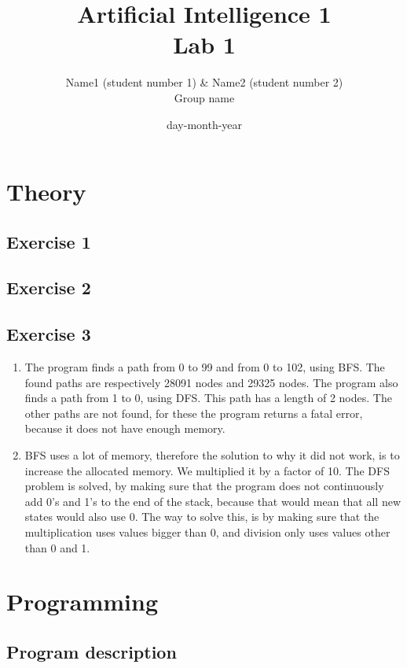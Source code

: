 \documentclass{article}
\title{Artificial Intelligence 1 \\ Lab 1}%
\author{Name1 (student number 1) \& Name2 (student number 2) \\ Group name} %
\date{day-month-year}%
\begin{document}
\maketitle

\section*{Theory}
\subsection*{Exercise 1}

\subsection*{Exercise 2}

\subsection*{Exercise 3}
\begin{enumerate}
\item The program finds a path from 0 to 99 and from 0 to 102, using BFS. The found paths are respectively 28091 nodes and 29325 nodes. The program also finds a path from 1 to 0, using DFS. This path has a length of 2 nodes. The other paths are not found, for these the program returns a fatal error, because it does not have enough memory. 

\item BFS uses a lot of memory, therefore the solution to why it did not work, is to increase the allocated memory.  We multiplied it by a factor of 10. The DFS problem is solved, by making sure that the program does not continuously add 0's and 1's to the end of the stack, because that would mean that all new states would also use 0. The way to solve this, is by making sure that the multiplication uses values bigger than 0, and division only uses values other than 0 and 1.

\end{enumerate}
\section*{Programming} 
\subsection*{Program description}
\end{document}

